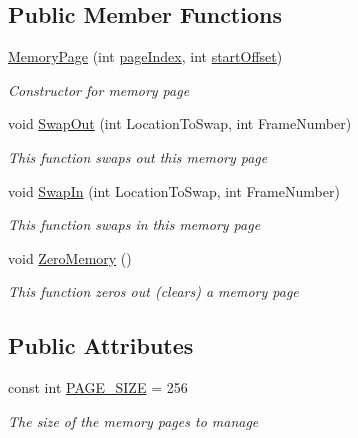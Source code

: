 \subsection*{Public Member Functions}
\begin{DoxyCompactItemize}
\item 
\hyperlink{class_c_p_u___o_s___simulator_1_1_memory_1_1_memory_page_a9b162033b9c9cc4dd28d683706fe6d2e}{Memory\+Page} (int \hyperlink{class_c_p_u___o_s___simulator_1_1_memory_1_1_memory_page_acf60a7bdefab6120fe080854b5f0b38b}{page\+Index}, int \hyperlink{class_c_p_u___o_s___simulator_1_1_memory_1_1_memory_page_a6fe2e28385db19a1968a41efe3df3f38}{start\+Offset})
\begin{DoxyCompactList}\small\item\em Constructor for memory page \end{DoxyCompactList}\item 
void \hyperlink{class_c_p_u___o_s___simulator_1_1_memory_1_1_memory_page_a53d6deee146e06754ea770755b17ff14}{Swap\+Out} (int Location\+To\+Swap, int Frame\+Number)
\begin{DoxyCompactList}\small\item\em This function swaps out this memory page \end{DoxyCompactList}\item 
void \hyperlink{class_c_p_u___o_s___simulator_1_1_memory_1_1_memory_page_a79e408c1be5efbaa6969ab66cc46930f}{Swap\+In} (int Location\+To\+Swap, int Frame\+Number)
\begin{DoxyCompactList}\small\item\em This function swaps in this memory page \end{DoxyCompactList}\item 
void \hyperlink{class_c_p_u___o_s___simulator_1_1_memory_1_1_memory_page_a0c43cf3b2640f17b8d732acbaaaead96}{Zero\+Memory} ()
\begin{DoxyCompactList}\small\item\em This function zeros out (clears) a memory page \end{DoxyCompactList}\end{DoxyCompactItemize}
\subsection*{Public Attributes}
\begin{DoxyCompactItemize}
\item 
const int \hyperlink{class_c_p_u___o_s___simulator_1_1_memory_1_1_memory_page_a502abee83030136a808d5b5f0c0fe7ec}{P\+A\+G\+E\+\_\+\+S\+I\+Z\+E} = 256
\begin{DoxyCompactList}\small\item\em The size of the memory pages to manage \end{DoxyCompactList}\end{DoxyCompactItemize}
